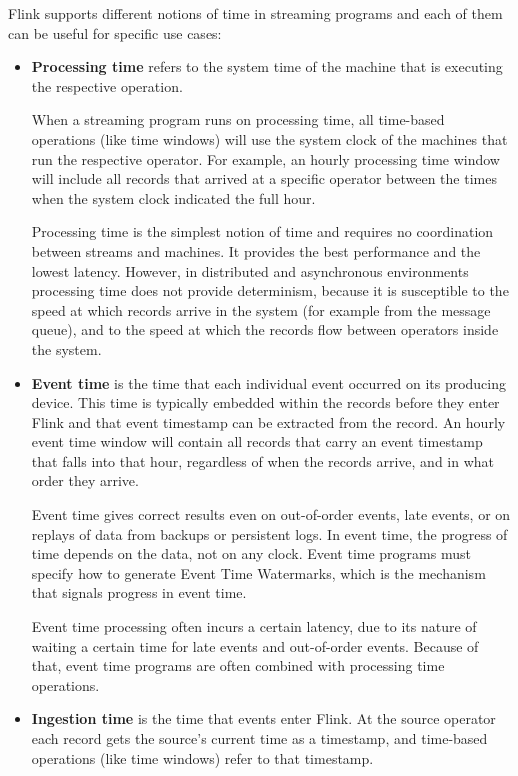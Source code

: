Flink supports different notions of time in streaming programs and each of them can be useful for specific use cases:

\begin{itemize}
    \item \textbf{Processing time} refers to the system time of the machine that is executing the respective operation.
    
    When a streaming program runs on processing time, all time-based operations (like time windows) will use the system clock of the machines that run the respective operator. For example, an hourly processing time window will include all records that arrived at a specific operator between the times when the system clock indicated the full hour.
    
    Processing time is the simplest notion of time and requires no coordination between streams and machines. It provides the best performance and the lowest latency. However, in distributed and asynchronous environments processing time does not provide determinism, because it is susceptible to the speed at which records arrive in the system (for example from the message queue), and to the speed at which the records flow between operators inside the system.
    
    \item \textbf{Event time} is the time that each individual event occurred on its producing device. This time is typically embedded within the records before they enter Flink and that event timestamp can be extracted from the record. An hourly event time window will contain all records that carry an event timestamp that falls into that hour, regardless of when the records arrive, and in what order they arrive.
    
    Event time gives correct results even on out-of-order events, late events, or on replays of data from backups or persistent logs. In event time, the progress of time depends on the data, not on any clock. Event time programs must specify how to generate Event Time Watermarks, which is the mechanism that signals progress in event time.
    
    Event time processing often incurs a certain latency, due to its nature of waiting a certain time for late events and out-of-order events. Because of that, event time programs are often combined with processing time operations.
    
    \item \textbf{Ingestion time} is the time that events enter Flink. At the source operator each record gets the source’s current time as a timestamp, and time-based operations (like time windows) refer to that timestamp.
    

\end{itemize}
